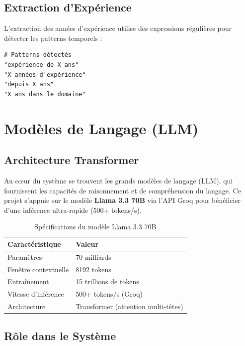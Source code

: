 \documentclass{rapportECL}
\begin{document}
\subsection{Extraction d'Expérience}

L'extraction des années d'expérience utilise des expressions régulières pour détecter les patterns temporels :

\begin{lstlisting}[caption=Exemple d'extraction d'expérience, label=lst:experience_extraction]
# Patterns détectés
"expérience de X ans"
"X années d'expérience"
"depuis X ans"
"X ans dans le domaine"
\end{lstlisting}

\section{Modèles de Langage (LLM)}

\subsection{Architecture Transformer}

Au cœur du système se trouvent les grands modèles de langage (LLM), qui fournissent les capacités de raisonnement et de compréhension du langage. Ce projet s'appuie sur le modèle \textbf{Llama 3.3 70B} via l'API Groq pour bénéficier d'une inférence ultra-rapide (500+ tokens/s).

\begin{table}[H]
\centering
\begin{tabular}{ll}
\toprule
\textbf{Caractéristique} & \textbf{Valeur} \\
\midrule
Paramètres & 70 milliards \\
Fenêtre contextuelle & 8192 tokens \\
Entraînement & 15 trillions de tokens \\
Vitesse d'inférence & 500+ tokens/s (Groq) \\
Architecture & Transformer (attention multi-têtes) \\
\bottomrule
\end{tabular}
\caption{Spécifications du modèle Llama 3.3 70B}
\label{tab:llm_specs}
\end{table}

\subsection{Rôle dans le Système}
\end{document}
